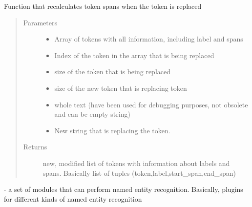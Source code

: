 \documentclass[letterpaper,10pt,english]{sphinxmanual}
\begin{document}
\begin{fulllineitems}
\label{\detokenize{index:mask_framework.recalculate_tokens}}
Function that recalculates token spans when the token is replaced
\begin{quote}\begin{description}
\item[{Parameters}] \leavevmode\begin{itemize}
\item {} 
 \textendash{} Array of tokens with all information, including label and spans

\item {} 
 \textendash{} Index of the token in the array that is being replaced

\item {} 
 \textendash{} size of the token that is being replaced

\item {} 
 \textendash{} size of the new token that is replacing token

\item {} 
 \textendash{} whole text (have been used for debugging purposes, not obsolete and can be empty string)

\item {} 
 \textendash{} New string that is replacing the token.

\end{itemize}

\item[{Returns}] \leavevmode
new, modified list of tokens with information about labels and spans. Basically list of tuples (token,label,start\_span,end\_span)

\end{description}\end{quote}

\end{fulllineitems}

\label{\detokenize{index:module-ner_plugins}}
 - a set of modules that can perform named entity recognition. Basically, plugins for different kinds of named entity recognition
\end{document}
